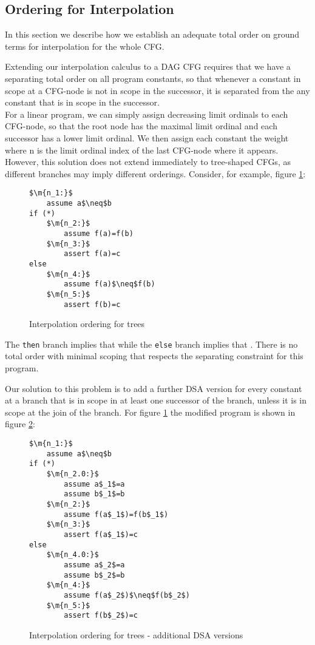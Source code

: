 

\subsection{Ordering for Interpolation}
In this section we describe how we establish an adequate total order on ground terms for interpolation for the whole CFG.

Extending our interpolation calculus to a DAG CFG requires that we have a separating total order on all program constants, so that whenever a constant in scope at a CFG-node is not in scope in the successor, it is separated from the any constant that is in scope in the successor.\\
For a linear program, we can simply assign decreasing limit ordinals to each CFG-node, so that the root node has the maximal limit ordinal and each successor has a lower limit ordinal. We then assign each constant the weight  where n is the limit ordinal index of the last CFG-node where it appears.\\
However, this solution does not extend immediately to tree-shaped CFGs, as different branches may imply different orderings. Consider, for example, figure \ref{snippet4.5.1}:
\begin{figure}[H]
\begin{lstlisting}
$\m{n_1:}$
	assume a$\neq$b
if (*)
	$\m{n_2:}$
		assume f(a)=f(b)
	$\m{n_3:}$
		assert f(a)=c
else
	$\m{n_4:}$
		assume f(a)$\neq$f(b)
	$\m{n_5:}$
		assert f(b)=c
\end{lstlisting}
\caption{Interpolation ordering for trees}
\label{snippet4.5.1}
\end{figure}

The \lstinline|then| branch implies that  while the \lstinline|else|  branch implies that .
There is no total order with minimal scoping that respects the separating constraint for this program.

Our solution to this problem is to add a further DSA version for every constant at a branch that is in scope in at least one successor of the branch, unless it is in scope at the join of the branch.
For figure \ref{snippet4.5.1} the modified program is shown in figure \ref{snippet4.5.1b}:
\begin{figure}[H]
\begin{lstlisting}
$\m{n_1:}$
	assume a$\neq$b
if (*)
	$\m{n_2.0:}$
		assume a$_1$=a
		assume b$_1$=b
	$\m{n_2:}$
		assume f(a$_1$)=f(b$_1$)
	$\m{n_3:}$
		assert f(a$_1$)=c
else
	$\m{n_4.0:}$
		assume a$_2$=a
		assume b$_2$=b
	$\m{n_4:}$
		assume f(a$_2$)$\neq$f(b$_2$)
	$\m{n_5:}$
		assert f(b$_2$)=c
\end{lstlisting}
\caption{Interpolation ordering for trees - additional DSA versions}
\label{snippet4.5.1b}
\end{figure}

